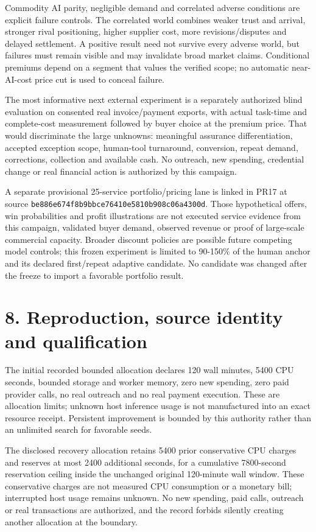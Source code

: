 \documentclass[10pt,letterpaper]{article}
\begin{document}
Commodity AI parity, negligible demand and correlated adverse conditions are explicit failure controls. The correlated world combines weaker trust and arrival, stronger rival positioning, higher supplier cost, more revisions/disputes and delayed settlement. A positive result need not survive every adverse world, but failures must remain visible and may invalidate broad market claims. Conditional premiums depend on a segment that values the verified scope; no automatic near-AI-cost price cut is used to conceal failure.

The most informative next external experiment is a separately authorized blind evaluation on consented real invoice/payment exports, with actual task-time and complete-cost measurement followed by buyer choice at the premium price. That would discriminate the large unknowns: meaningful assurance differentiation, accepted exception scope, human-tool turnaround, conversion, repeat demand, corrections, collection and available cash. No outreach, new spending, credential change or real financial action is authorized by this campaign.

A separate provisional 25-service portfolio/pricing lane is linked in PR17 at source \texttt{be886e67\allowbreak{}4f8b9bbc\allowbreak{}e76410e5\allowbreak{}810b908c\allowbreak{}06a4300d}. Those hypothetical offers, win probabilities and profit illustrations are not executed service evidence from this campaign, validated buyer demand, observed revenue or proof of large-scale commercial capacity. Broader discount policies are possible future competing model controls; this frozen experiment is limited to 90-150\% of the human anchor and its declared first/repeat adaptive candidate. No candidate was changed after the freeze to import a favorable portfolio result.

\section*{8. Reproduction, source identity and qualification}
The initial recorded bounded allocation declares 120 wall minutes, 5400 CPU seconds, bounded storage and worker memory, zero new spending, zero paid provider calls, no real outreach and no real payment execution. These are allocation limits; unknown host inference usage is not manufactured into an exact resource receipt. Persistent improvement is bounded by this authority rather than an unlimited search for favorable seeds.

The disclosed recovery allocation retains 5400 prior conservative CPU charges and reserves at most 2400 additional seconds, for a cumulative 7800-second reservation ceiling inside the unchanged original 120-minute wall window. These conservative charges are not measured CPU consumption or a monetary bill; interrupted host usage remains unknown. No new spending, paid calls, outreach or real transactions are authorized, and the record forbids silently creating another allocation at the boundary.
\end{document}
